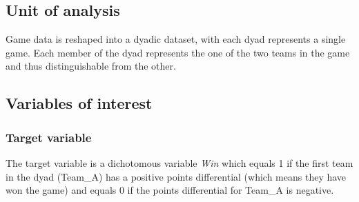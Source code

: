 \documentclass[12pt, letterpaper, twoside]{article}
\begin{document}
\subsection{Unit of analysis}
Game data is reshaped into a dyadic dataset, with each dyad represents a single game. Each member of the dyad represents the one of the two teams in the game and thus distinguishable from the other.

\subsection{Variables of interest}

\subsubsection{Target variable}
The target variable is a dichotomous variable \textit{Win} which equals 1 if the first team in the dyad (Team\_A) has a positive points differential (which means they have won the game) and equals 0 if the points differential for Team\_A is negative. 
\end{document}
